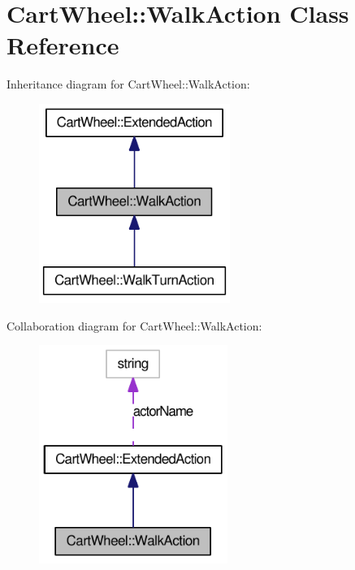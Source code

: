 \hypertarget{classCartWheel_1_1WalkAction}{
\section{CartWheel::WalkAction Class Reference}
\label{classCartWheel_1_1WalkAction}
}


Inheritance diagram for CartWheel::WalkAction:\nopagebreak
\begin{figure}[H]
\begin{center}
\leavevmode
\includegraphics[width=176pt]{classCartWheel_1_1WalkAction__inherit__graph}
\end{center}
\end{figure}


Collaboration diagram for CartWheel::WalkAction:\nopagebreak
\begin{figure}[H]
\begin{center}
\leavevmode
\includegraphics[width=174pt]{classCartWheel_1_1WalkAction__coll__graph}
\end{center}
\end{figure}
